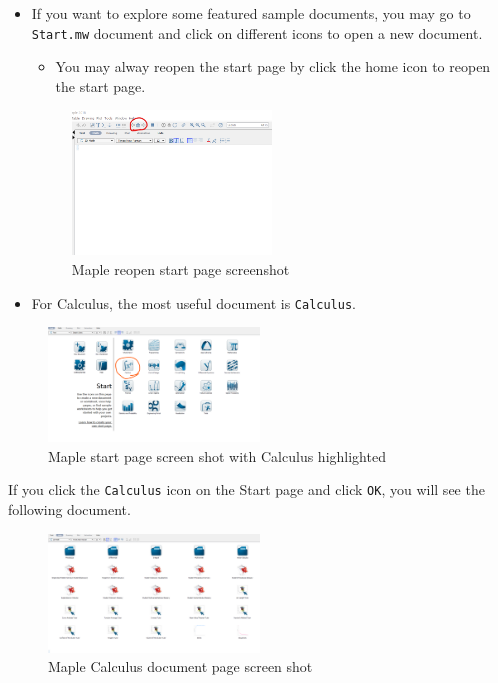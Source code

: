 \documentclass[
  en,11pt,simple]{elegantbook}
\providecommand{\tightlist}{%
  \setlength{\itemsep}{0pt}\setlength{\parskip}{0pt}}
\begin{document}
\begin{itemize}
\item
  If you want to explore some featured sample documents, you may go to \texttt{Start.mw} document and click on different icons to open a new document.

  \begin{itemize}
  \tightlist
  \item
    You may alway reopen the start page by click the home icon to reopen the start page.
  \end{itemize}

  \begin{figure}
  \centering
  \includegraphics[width=0.5\textwidth,height=\textheight]{figs/Home-reopen-start-page.png}
  \caption{Maple reopen start page screenshot}
  \end{figure}
\item
  For Calculus, the most useful document is \texttt{Calculus}.
\end{itemize}

\begin{figure}
\centering
\includegraphics[width=0.5\textwidth,height=\textheight]{figs/Start-Page-Calculus.png}
\caption{Maple start page screen shot with Calculus highlighted}
\end{figure}

If you click the \texttt{Calculus} icon on the Start page and click \texttt{OK}, you will see the following document.

\begin{figure}
\centering
\includegraphics[width=0.5\textwidth,height=\textheight]{figs/Calculus-Doc.png}
\caption{Maple Calculus document page screen shot}
\end{figure}
\end{document}

